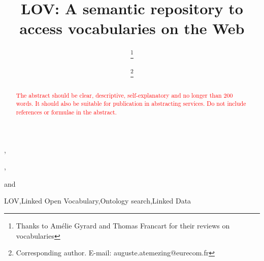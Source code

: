 \documentclass{iosart2c}
\begin{document}
\begin{frontmatter}                        %

%
\title{LOV: A semantic repository to access vocabularies on the Web}




\author[A]{   \thanks{Thanks to Am\'elie Gyrard and Thomas Francart for their reviews on vocabularies}},
\author[B]{ \thanks{Corresponding author. E-mail: auguste.atemezing@eurecom.fr}},
\author[C]{ }
and
\author[D]{ }
\address[A]{Fujitsu Laboratories, Dublin, Ireland\\
E-mail: Pierre-Yves.Vandenbussche@ie.fujitsu.com}
\address[B]{Multimedia Communication Department, EURECOM, Campus SophiaTech
450, route des Chappes, 06410 Biot, France\\
E-mail: auguste.atemezing@eurecom.fr}
\address[C]{Ontology Engineering Group (OEG), 
Universidad Polit\'ecnica de Madrid, Madrid, Spain\\
E-mail: mpoveda@fi.upm.es}
\address[D]{Mondeca, 35 boulevard de Strasbourg, 75010 Paris, France
\\
E-mail: bernard.vatant@mondeca.com}


\begin{abstract}
\textcolor{red}{The abstract should be clear, descriptive, self-explanatory and no longer than 200 words. It should also
be suitable for publication in abstracting services. Do not include references or formulae in the abstract.}
\end{abstract}

\begin{keyword}
LOV\sep Linked Open Vocabulary\sep Ontology search\sep Linked Data
\end{keyword}

\end{frontmatter}
\end{document}
